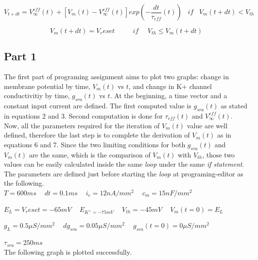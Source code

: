 \documentclass{article}
\begin{document}
\begin{equation}
 V_{t+dt}=V_{\infty}^{eff}(t)+[V_{m}(t)-V_{\infty}^{eff}(t)]exp(-\frac{dt}{\tau_{eff}}(t))\,\,\,\,\,if\,\,\,\,\,V_{m}(t+dt)<V_{th}
\end{equation}

\begin{equation}
 V_{m}(t+dt)=V_reset\,\,\,\,\,\,\,\,\,\,\,\,\,\,\,\,if\,\,\,\,\,\,\,\, V_{th} \le V_{m}(t+dt)
\end{equation}

\begin{center}
 \section*{Part 1}
\end{center}



The first part of programing assignment aims to plot two graphs: change in membrane potential by time, $V_{m}(t)$ vs $t$, and change in K+ channel conductivitiy by time, $g_{sra}(t)$ vs $t$. At the beginning, a time vector and a constant input current are defined.  The first computed value is $g_{sra}(t)$ as stated in equations 2 and 3. Second computation is done for $\tau_{eff}(t)$ and $V_{\infty}^{eff}(t)$. Now, all the parameters required for the iteration of $V_{m}(t)$ value are well defined, therefore the last step is to complete the derivation of $V_{m}(t)$ as in equations 6 and 7. Since the two limiting conditions for both $g_{sra}(t)$ and $V_{m}(t)$ are the same, which is the comparison of $V_{m}(t)$ with $V_{th}$, those two values can be easily calculated inside the same \textit{loop} under the same \textit{if statement}.\\

The parameters are defined just before starting the \textit{loop} at programing-editor as the following.\\

$
T=600 ms\,\,\,\,\,\,\ dt=0.1 ms\,\,\,\,\,\,\ i_{e}=12 nA/mm^2 \,\,\,\,\,\,\ c_{m}=15 nF/mm^2 $


$
E_{L}=V_reset=-65 mV\,\,\,\,\,\,\ E_{K^{+}=-75 mV}\,\,\,\,\,\,\ V_{th}=-45 mV\,\,\,\,\,\,\ V_{m}(t=0)=E_{L} $

$
g_{L}=0.5 \mu S/mm^{2}\,\,\,\,\,\,\ dg_{sra}=0.05 \mu S/mm^{2}\,\,\,\,\,\,\ g_{sra}(t=0)=0 \mu S/mm^2 \,\,\,\,\,\,\  $

$ \tau_{sra}=250 ms $ \\

The following graph is plotted successfully.\\
\end{document}
